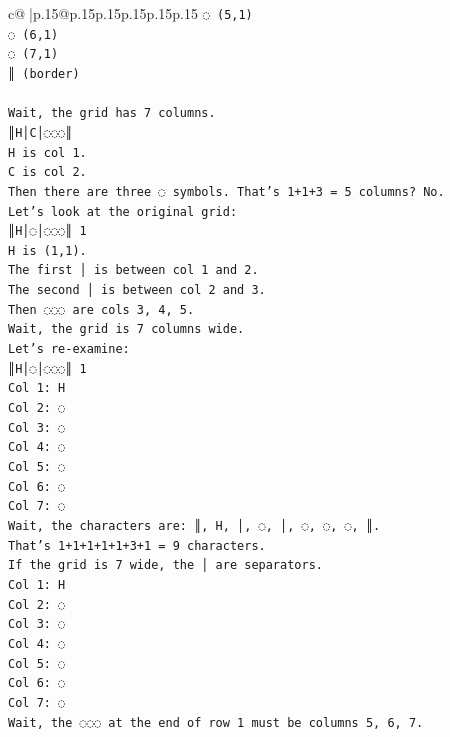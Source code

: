 \documentclass{article}
\begin{document}
{\begin{supertabular}{c@{$\;$}|p{.15\linewidth}@{}p{.15\linewidth}p{.15\linewidth}p{.15\linewidth}p{.15\linewidth}p{.15\linewidth}}
{{{\texttt{◌ (5,1)} \\
\texttt{◌ (6,1)} \\
\texttt{◌ (7,1)} \\
\texttt{║ (border)} \\
\\ 
\texttt{Wait, the grid has 7 columns.} \\
\texttt{║H│C│◌◌◌║} \\
\texttt{H is col 1.} \\
\texttt{C is col 2.} \\
\texttt{Then there are three ◌ symbols. That's 1+1+3 = 5 columns? No.} \\
\texttt{Let's look at the original grid:} \\
\texttt{║H│◌│◌◌◌║ 1} \\
\texttt{H is (1,1).} \\
\texttt{The first │ is between col 1 and 2.} \\
\texttt{The second │ is between col 2 and 3.} \\
\texttt{Then ◌◌◌ are cols 3, 4, 5.} \\
\texttt{Wait, the grid is 7 columns wide.} \\
\texttt{Let's re{-}examine:} \\
\texttt{║H│◌│◌◌◌║ 1} \\
\texttt{Col 1: H} \\
\texttt{Col 2: ◌} \\
\texttt{Col 3: ◌} \\
\texttt{Col 4: ◌} \\
\texttt{Col 5: ◌} \\
\texttt{Col 6: ◌} \\
\texttt{Col 7: ◌} \\
\texttt{Wait, the characters are: ║, H, │, ◌, │, ◌, ◌, ◌, ║.} \\
\texttt{That's 1+1+1+1+1+3+1 = 9 characters.} \\
\texttt{If the grid is 7 wide, the │ are separators.} \\
\texttt{Col 1: H} \\
\texttt{Col 2: ◌} \\
\texttt{Col 3: ◌} \\
\texttt{Col 4: ◌} \\
\texttt{Col 5: ◌} \\
\texttt{Col 6: ◌} \\
\texttt{Col 7: ◌} \\
\texttt{Wait, the ◌◌◌ at the end of row 1 must be columns 5, 6, 7.} \\
}}}
\end{supertabular}}
\end{document}
